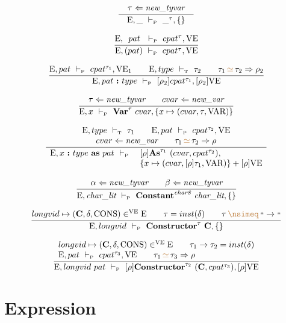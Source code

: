 \documentclass[11pt,a4paper]{article}
\newcommand{\key}[1]{\textrm{\textbf{#1}}}
\newcommand{\unify}[3]{#1\,{\color{brown}{\simeq}}\,#2 \Rightarrow #3}
\newcommand{\notunifiable}[2]{#1\,{\color{brown}{\nsimeq}}\,#2}
\newcommand{\braced}[1]{\{#1\}}
\newcommand{\wildcard}{{\color{gray}\scriptstyle\textbf{*}}}
\newcommand{\litchar}{\textit{char\_lit}}
\newcommand{\Char}[1]{\textit{char#1}}
\newcommand{\Env}  {\textrm{E}}
\newcommand{\VE}   {\textrm{VE}}
\newcommand{\VKC}  {\textrm{CONS}}
\newcommand{\VKV}  {\textrm{VAR}}
\newcommand{\vcon} {\mathbf{C}}
\newcommand{\Empty}{\braced{}}
\newcommand{\vdashP}  {\ \vdash_{\textrm{\tiny P}}\  }
\newcommand{\vdashT}  {\ \vdash_{\textrm{\tiny T}}\  }
\newcommand{\corenew}[1]{\textit{new\_#1}}
\begin{document}
\[
\cfrac
 {\tau \Leftarrow \corenew{tyvar}}
 {\quad\Env, \_ \vdashP \_ ^ \tau, \Empty\quad}
\]

\[
\cfrac
 {\Env,\ \, pat\ \vdashP cpat^\tau,\VE}
 {\Env,(pat) \vdashP cpat^\tau,\VE}
\]

\[
\cfrac
 {\Env,pat \vdashP cpat^{\tau_1},\VE_1    \qquad
  \Env, type \vdashT \tau_2             \qquad
  \unify{\tau_1}{\tau_2}{\rho_2}}
 {\Env, pat\ \key{:}\ type \vdashP [\rho_2]cpat^{\tau_1}, [\rho_2]\VE}
\]

\[
\cfrac
 {\tau \Leftarrow \corenew{tyvar}   \qquad
  cvar \Leftarrow \corenew{var}}
 {\Env, x \vdashP \key{Var}^\tau\ cvar, \braced{x \mapsto (cvar, \tau, \VKV)}}
\]

\[
\cfrac
 {\begin{array}{c}
  \Env,type \vdashT \tau_1              \qquad
  \Env,pat \vdashP cpat^{\tau_2}, \VE     \\
  cvar \Leftarrow \corenew{var}         \qquad  
  \unify{\tau_1}{\tau_2}{\rho}          \\
  \end{array}}
 {\begin{array}{ll}
   \Env, x\ \key{:}\ type\ \key{as}\ pat \vdashP 
    & [\rho]\key{As}^{\tau_1}\ (cvar, cpat^{\tau_2}), \\
    & \braced{x \mapsto (cvar, [\rho]\tau_1, \VKV)} + [\rho]\VE
   \end{array}}
\]

\[
\cfrac
 {\alpha \Leftarrow \corenew{tyvar} \qquad
  \beta  \Leftarrow \corenew{tyvar}}
 {\Env, \litchar \vdashP 
    \key{Constant}^{\Char{8}}\ \litchar, \Empty}
\]

\[
\cfrac
 {longvid \mapsto (\vcon, \delta, \VKC) \in^\VE \Env \qquad
  \tau = inst(\delta)    \qquad
  \notunifiable{\tau}{\wildcard \to \wildcard} }
 {\Env, longvid \vdashP \key{Constructor}^{\tau}\ \vcon, \Empty}
\]

\[
\cfrac
 {\begin{array}{l}
  longvid \mapsto (\vcon, \delta, \VKC) \in^\VE \Env     \qquad
  \tau_1\to\tau_2 = inst(\delta)                         \\
  \Env,pat \vdashP cpat^{\tau_3},\VE                     \qquad
  \unify{\tau_1}{\tau_3}{\rho}                           \\
  \end{array}}
 {\Env, longvid\ pat \vdashP [\rho]\key{Constructor}^{\tau_2}\ (\vcon, cpat^{\tau_3}), [\rho]\VE}
\]

\section {Expression}
\end{document}
